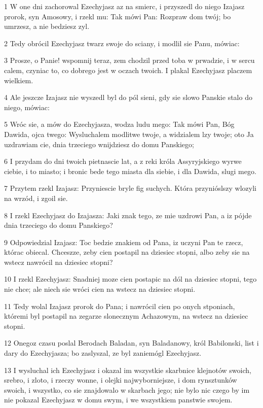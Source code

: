 \par 1 W one dni zachorowal Ezechyjasz az na smierc, i przyszedl do niego Izajasz prorok, syn Amosowy, i rzekl mu: Tak mówi Pan: Rozpraw dom twój; bo umrzesz, a nie bedziesz zyl.
\par 2 Tedy obrócil Ezechyjasz twarz swoje do sciany, i modlil sie Panu, mówiac:
\par 3 Prosze, o Panie! wspomnij teraz, zem chodzil przed toba w prwadzie, i w sercu calem, czyniac to, co dobrego jest w oczach twoich. I plakal Ezechyjasz placzem wielkiem.
\par 4 Ale jeszcze Izajasz nie wyszedl byl do pól sieni, gdy sie slowo Panskie stalo do niego, mówiac:
\par 5 Wróc sie, a mów do Ezechyjasza, wodza ludu mego: Tak mówi Pan, Bóg Dawida, ojca twego: Wysluchalem modlitwe twoje, a widzialem lzy twoje; oto Ja uzdrawiam cie, dnia trzeciego wnijdziesz do domu Panskiego;
\par 6 I przydam do dni twoich pietnascie lat, a z reki króla Assyryjskiego wyrwe ciebie, i to miasto; i bronic bede tego miasta dla siebie, i dla Dawida, slugi mego.
\par 7 Przytem rzekl Izajasz: Przyniescie bryle fig suchych. Która przynióslszy wlozyli na wrzód, i zgoil sie.
\par 8 I rzekl Ezechyjasz do Izajasza: Jaki znak tego, ze mie uzdrowi Pan, a iz pójde dnia trzeciego do domu Panskiego?
\par 9 Odpowiedzial Izajasz: Toc bedzie znakiem od Pana, iz uczyni Pan te rzecz, którac obiecal. Chceszze, zeby cien postapil na dziesiec stopni, albo zeby sie na wstecz nawrócil na dziesiec stopni?
\par 10 I rzekl Ezechyjasz: Snadniej moze cien postapic na dól na dziesiec stopni, tego nie chce; ale niech sie wróci cien na wstecz na dziesiec stopni.
\par 11 Tedy wolal Izajasz prorok do Pana; i nawrócil cien po onych stponiach, któremi byl postapil na zegarze slonecznym Achazowym, na wstecz na dziesiec stopni.
\par 12 Onegoz czasu poslal Berodach Baladan, syn Baladanowy, król Babilonski, list i dary do Ezechyjasza; bo zaslyszal, ze byl zaniemógl Ezechyjasz.
\par 13 I wysluchal ich Ezechyjasz i okazal im wszystkie skarbnice klejnotów swoich, srebro, i zloto, i rzeczy wonne, i olejki najwyborniejsze, i dom rynsztunków swoich, i wszystko, co sie znajdowalo w skarbach jego; nie bylo nic czego by im nie pokazal Ezechyjasz w domu swym, i we wszystkiem panstwie swojem.
